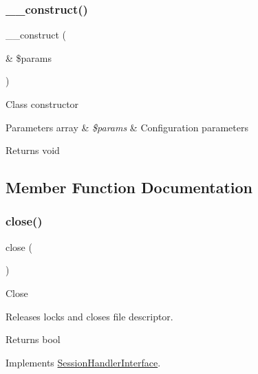 \subsubsection{\texorpdfstring{\+\_\+\+\_\+construct()}{\_\_construct()}}
{\footnotesize\ttfamily \+\_\+\+\_\+construct (\begin{DoxyParamCaption}\item[{\&}]{\$params }\end{DoxyParamCaption})}

Class constructor


\begin{DoxyParams}[1]{Parameters}
array & {\em \$params} & Configuration parameters \\
\hline
\end{DoxyParams}
\begin{DoxyReturn}{Returns}
void 
\end{DoxyReturn}


\subsection{Member Function Documentation}
\mbox{\label{class_c_i___session__files__driver_aa69c8bf1f1dcf4e72552efff1fe3e87e}} 
\subsubsection{\texorpdfstring{close()}{close()}}
{\footnotesize\ttfamily close (\begin{DoxyParamCaption}{ }\end{DoxyParamCaption})}

Close

Releases locks and closes file descriptor.

\begin{DoxyReturn}{Returns}
bool 
\end{DoxyReturn}


Implements \mbox{\hyperlink{interface_session_handler_interface_aa69c8bf1f1dcf4e72552efff1fe3e87e}{Session\+Handler\+Interface}}.

\mbox{\label{class_c_i___session__files__driver_aaec5812f6b4eb6835f88d3baa06a002a}} 
